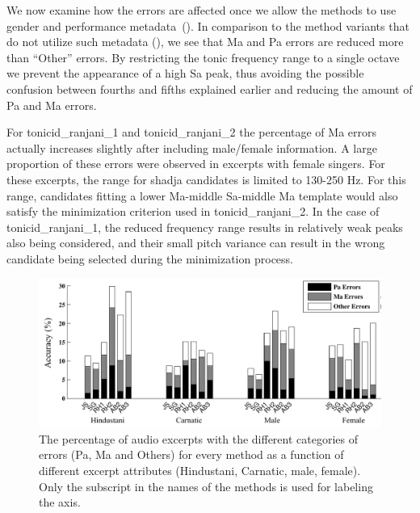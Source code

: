 {We now examine how the errors are affected once we allow the methods to use gender and performance metadata~(). In comparison to the method variants that do not utilize such metadata (), we see that Ma and Pa errors are reduced more than ``Other'' errors. By restricting the tonic frequency range to a single octave we prevent the appearance of a high Sa peak, thus avoiding the possible confusion between fourths and fifths explained earlier and reducing the amount of Pa and Ma errors.

For \acrshort{tonicid_ranjani_1} and \acrshort{tonicid_ranjani_2} the percentage of Ma errors actually increases slightly after including male/female information. A large proportion of these errors were observed in excerpts with female singers. For these excerpts, the range for \gls{shadja} candidates is limited to 130-250 Hz. For this range, candidates fitting a lower Ma-middle Sa-middle Ma template would also satisfy the minimization criterion used in \acrshort{tonicid_ranjani_2}. In the case of \acrshort{tonicid_ranjani_1}, the reduced frequency range results in relatively weak peaks also being considered, and their small pitch variance can result in the wrong candidate being selected during the minimization process.

\begin{figure}
	\begin{center}
		\includegraphics[width=\figSizeHundred]{ch05_preprocessing/figures/Category_Errors.pdf}
	\end{center}
	\caption[Percentage of Pa, Ma and `Other' type errors in tonic identification for different categories]{The percentage of audio excerpts with the different categories of errors (Pa, Ma and Others) for every method as a function of different excerpt attributes (Hindustani, Carnatic, male, female). Only the subscript in the names of the methods is used for labeling the axis.}
	\label{fig:tonic_identification_categorywise_errors}
\end{figure}

}
